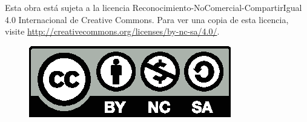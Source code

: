 \documentclass[a4paper, 10pt, oneside, titlepage, openany, onecolumn, final]{book}
\title{\tb{Geometría Lineal}}
\author{Álvaro García Tenorio \and Clara Isabel López González}
\date{\today}
\begin{document}
	\maketitle
	Esta obra está sujeta a la licencia Reconocimiento-NoComercial-CompartirIgual 4.0 Internacional de Creative Commons. Para ver una copia de esta licencia, visite \url{http://creativecommons.org/licenses/by-nc-sa/4.0/}.
	\begin{figure}[h]
		\centering
		\includegraphics[scale=1]{Graficos/by-nc-sa.eps}
	\end{figure}
	\tableofcontents
	
	
	
	
	
	
	
	
	
	
	
	\appendix
	
	
\end{document}
